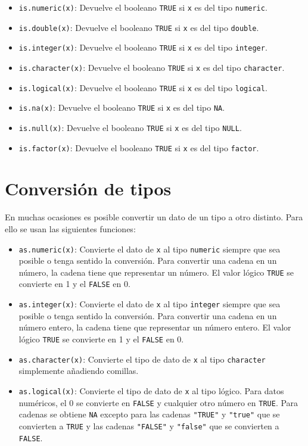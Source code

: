\documentclass[
]{book}
\providecommand{\tightlist}{%
  \setlength{\itemsep}{0pt}\setlength{\parskip}{0pt}}
\theoremstyle{definition}
\theoremstyle{definition}
\theoremstyle{definition}
\theoremstyle{definition}
\theoremstyle{remark}
\begin{document}
\begin{itemize}
\tightlist
\item
  \texttt{is.numeric(x)}: Devuelve el booleano \texttt{TRUE} si \texttt{x} es del tipo \texttt{numeric}.
\item
  \texttt{is.double(x)}: Devuelve el booleano \texttt{TRUE} si \texttt{x} es del tipo \texttt{double}.
\item
  \texttt{is.integer(x)}: Devuelve el booleano \texttt{TRUE} si \texttt{x} es del tipo \texttt{integer}.
\item
  \texttt{is.character(x)}: Devuelve el booleano \texttt{TRUE} si \texttt{x} es del tipo \texttt{character}.
\item
  \texttt{is.logical(x)}: Devuelve el booleano \texttt{TRUE} si \texttt{x} es del tipo \texttt{logical}.
\item
  \texttt{is.na(x)}: Devuelve el booleano \texttt{TRUE} si \texttt{x} es del tipo \texttt{NA}.
\item
  \texttt{is.null(x)}: Devuelve el booleano \texttt{TRUE} si \texttt{x} es del tipo \texttt{NULL}.
\item
  \texttt{is.factor(x)}: Devuelve el booleano \texttt{TRUE} si \texttt{x} es del tipo \texttt{factor}.
\end{itemize}

\hypertarget{conversiuxf3n-de-tipos}{%
\section{Conversión de tipos}\label{conversiuxf3n-de-tipos}}

En muchas ocasiones es posible convertir un dato de un tipo a otro distinto. Para ello se usan las siguientes funciones:

\begin{itemize}
\tightlist
\item
  \texttt{as.numeric(x)}: Convierte el dato de \texttt{x} al tipo \texttt{numeric} siempre que sea posible o tenga sentido la conversión. Para convertir una cadena en un número, la cadena tiene que representar un número. El valor lógico \texttt{TRUE} se convierte en 1 y el \texttt{FALSE} en 0.
\item
  \texttt{as.integer(x)}: Convierte el dato de \texttt{x} al tipo \texttt{integer} siempre que sea posible o tenga sentido la conversión. Para convertir una cadena en un número entero, la cadena tiene que representar un número entero. El valor lógico \texttt{TRUE} se convierte en 1 y el \texttt{FALSE} en 0.
\item
  \texttt{as.character(x)}: Convierte el tipo de dato de \texttt{x} al tipo \texttt{character} simplemente añadiendo comillas.
\item
  \texttt{as.logical(x)}: Convierte el tipo de dato de \texttt{x} al tipo lógico. Para datos numéricos, el 0 se convierte en \texttt{FALSE} y cualquier otro número en \texttt{TRUE}. Para cadenas se obtiene \texttt{NA} excepto para las cadenas \texttt{"TRUE"} y \texttt{"true"} que se convierten a \texttt{TRUE} y las cadenas \texttt{"FALSE"} y \texttt{"false"} que se convierten a \texttt{FALSE}.
\end{itemize}
\end{document}
